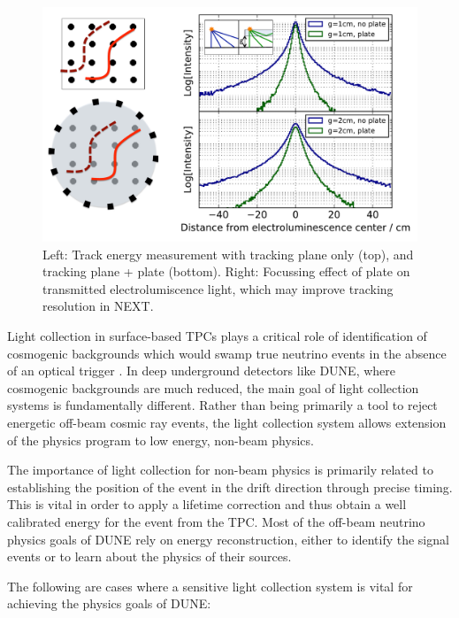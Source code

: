 \begin{figure}[t!]
\begin{centering}

\includegraphics[width=0.70\columnwidth]{./images/FocussingEffectAndTrackShape.pdf}
\par\end{centering}

\caption{Left: Track energy measurement with tracking plane only (top), and tracking plane + plate (bottom).  Right: Focussing effect of plate on transmitted electrolumiscence light, which may improve tracking resolution in NEXT. \label{fig:TrackingEffect}}

\end{figure}


Light collection in surface-based TPCs plays a critical role of identification of cosmogenic backgrounds which would swamp true neutrino events in the absence of an optical trigger \cite{MicroBooNECosmic}. In deep underground detectors like DUNE, where cosmogenic backgrounds are much reduced, the main goal of light collection systems is fundamentally different. Rather than being primarily a tool to reject energetic off-beam cosmic ray events, the light collection system allows extension of the physics program to low energy, non-beam physics.

The importance of light collection for non-beam physics is primarily related to establishing the position of the event in the drift direction through precise timing.  This is vital in order to apply a lifetime correction and thus obtain a well calibrated energy for the event from the TPC.  Most of the off-beam neutrino physics goals of DUNE rely on energy reconstruction, either to identify the signal events or to learn about the physics of their sources.

The following are cases where a sensitive light collection system is vital for achieving the physics goals of DUNE:

